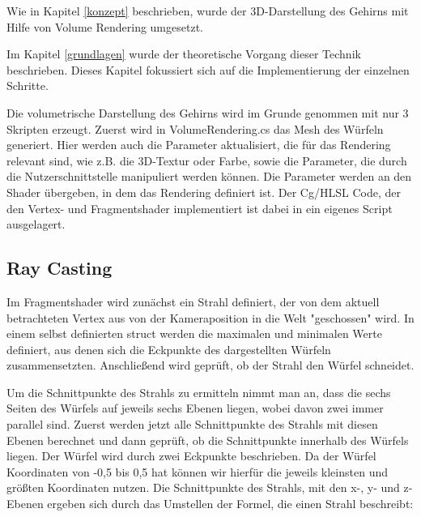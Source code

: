 Wie in Kapitel \ref{konzept} beschrieben, wurde der 3D-Darstellung des Gehirns mit Hilfe von Volume Rendering umgesetzt. 

Im Kapitel \ref{grundlagen} wurde der theoretische Vorgang dieser Technik beschrieben. Dieses Kapitel fokussiert sich auf die Implementierung der einzelnen Schritte.

Die volumetrische Darstellung des Gehirns wird im Grunde genommen mit nur 3 Skripten erzeugt. Zuerst wird in VolumeRendering.cs das Mesh des Würfeln generiert. Hier werden auch die Parameter aktualisiert, die für das Rendering relevant sind, wie z.B. die 3D-Textur oder Farbe, sowie die Parameter, die durch die Nutzerschnittstelle manipuliert werden können. 
Die Parameter werden an den Shader übergeben, in dem das Rendering definiert ist. Der Cg/HLSL Code, der den Vertex- und Fragmentshader implementiert ist dabei in ein eigenes Script ausgelagert.

\subsection{Ray Casting}

Im Fragmentshader wird zunächst ein Strahl definiert, der von dem aktuell betrachteten Vertex aus von der Kameraposition in die Welt "geschossen" wird. In einem selbst definierten struct werden die maximalen und minimalen Werte definiert, aus denen sich die Eckpunkte des dargestellten Würfeln zusammensetzten. Anschließend wird geprüft, ob der Strahl den Würfel schneidet. 

Um die Schnittpunkte des Strahls zu ermitteln nimmt man an, dass die sechs Seiten des Würfels auf jeweils sechs Ebenen liegen, wobei davon zwei immer parallel sind. Zuerst werden jetzt alle Schnittpunkte des Strahls mit diesen Ebenen berechnet und dann geprüft, ob die Schnittpunkte innerhalb des Würfels liegen.
Der Würfel wird durch zwei Eckpunkte beschrieben. Da der Würfel Koordinaten von -0,5 bis 0,5 hat können wir hierfür die jeweils kleinsten und größten Koordinaten nutzen. 
Die Schnittpunkte des Strahls, mit den x-, y- und z-Ebenen ergeben sich durch das Umstellen der Formel, die einen Strahl beschreibt:

